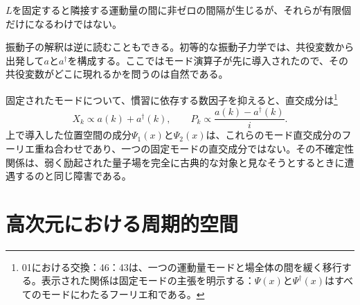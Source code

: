 \(L\)を固定すると隣接する運動量の間に非ゼロの間隔が生じるが、それらが有限個だけになるわけではない。

\begin{classroomqa}
\end{classroomqa}

振動子の解釈は逆に読むこともできる。初等的な振動子力学では、共役変数から出発して\(a\)と\(a^\dagger\)を構成する。ここではモード演算子が先に導入されたので、その共役変数がどこに現れるかを問うのは自然である。

\begin{classroomqa}
\end{classroomqa}

固定されたモードについて、慣習に依存する数因子を抑えると、直交成分は\footnote{01における交換：46：43は、一つの運動量モードと場全体の間を緩く移行する。表示された関係は固定モードの主張を明示する：\(\Psi(x)\)と\(\Psi^\dagger(x)\)はすべてのモードにわたるフーリエ和である。}
\begin{equation}
X_k\propto a(k)+a^\dagger(k),
\qquad
P_k\propto \frac{a(k)-a^\dagger(k)}{i}.
\end{equation}
上で導入した位置空間の成分\(\Psi_1(x)\)と\(\Psi_2(x)\)は、これらのモード直交成分のフーリエ重ね合わせであり、一つの固定モードの直交成分ではない。その不確定性関係は、弱く励起された量子場を完全に古典的な対象と見なそうとするときに遭遇するのと同じ障害である。

\section{高次元における周期的空間}

\begin{classroomqa}
\end{classroomqa}

